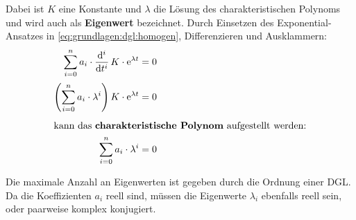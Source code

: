 \begin{frame}
{    %

    Dabei ist $K$ eine Konstante und $\lambda$ die Lösung des charakteristischen Polynoms 
    und wird auch als \textbf{Eigenwert} bezeichnet. 
    Durch Einsetzen des Exponential-Ansatzes in \ref{eq:grundlagen:dgl:homogen}, Differenzieren und Ausklammern:
    \begin{align}
        \sum_{i=0}^{n} a_i \cdot \dt[i]\, K \cdot \mathrm{e}^{\lambda t} &= 0 \nonumber\\[2pt]
        \left(\sum_{i=0}^{n} a_i \cdot \lambda^i \right) K \cdot \mathrm{e}^{\lambda t} &= 0 \nonumber\\[4pt]
    \intertext{kann das \textbf{charakteristische Polynom}\index{Differentialgleichung>Charakteristische Polynom} aufgestellt werden:}
        \sum_{i=0}^{n} a_i \cdot \lambda^i &= 0
    \end{align}

    Die maximale Anzahl an Eigenwerten ist gegeben durch die Ordnung einer DGL. 
    Da die Koeffizienten $a_i$ reell sind, müssen die Eigenwerte $\lambda_i$ ebenfalls reell sein, oder paarweise komplex konjugiert.

}
\end{frame}
